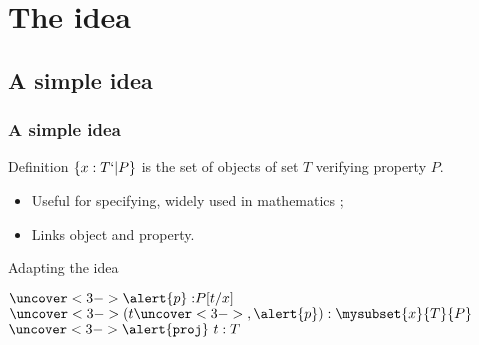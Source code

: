 
\frame{\tableofcontents}

\section{The idea}

\subsection{A simple idea}
\begin{frame}
  \frametitle{A simple idea}
  
  \begin{block}{Definition}
    $\{ x : T `| P \}$ is the set of objects of set $T$ verifying property $P$. 
  \end{block}
  
  \begin{itemize}
  \item Useful for specifying, widely used in mathematics ;    
  \item Links object and property.
  \end{itemize}
  \pause
  \begin{block}{Adapting the idea} 
    \begin{center}
      {$\uncover<3->{\alert{p} : }P[t/x]$}
      {$\uncover<3->{(}t\uncover<3->{, \alert{p})} : \mysubset{x}{T}{P}$}
      {}\DP\quad      
      {$\uncover<3->{\alert{\texttt{proj}}~}t : T$}
      {}
      \DP
    \end{center}
  \end{block}  
\end{frame}

